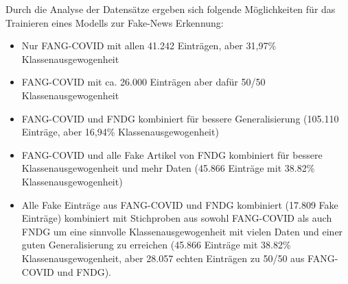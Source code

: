 Durch die Analyse der Datensätze ergeben sich folgende Möglichkeiten für das Trainieren eines Modells zur Fake-News Erkennung:
\begin{itemize}
    \item Nur FANG-COVID mit allen 41.242 Einträgen, aber 31,97\% Klassenausgewogenheit
    \item FANG-COVID mit ca. 26.000 Einträgen aber dafür 50/50 Klassenausgewogenheit
    \item FANG-COVID und FNDG kombiniert für bessere Generalisierung (105.110 Einträge, aber 16,94\% Klassenausgewogenheit)
    \item FANG-COVID und alle Fake Artikel von FNDG kombiniert für bessere Klassenausgewogenheit und mehr Daten
    (45.866 Einträge mit 38.82\% Klassenausgewogenheit)
    \item Alle Fake Einträge aus FANG-COVID und FNDG kombiniert (17.809 Fake Einträge) kombiniert mit Stichproben aus sowohl FANG-COVID als auch FNDG
    um eine sinnvolle Klassenausgewogenheit mit vielen Daten und einer guten Generalisierung zu erreichen (45.866 Einträge mit 38.82\% Klassenausgewogenheit,
    aber 28.057 echten Einträgen zu 50/50 aus FANG-COVID und FNDG).
\end{itemize}